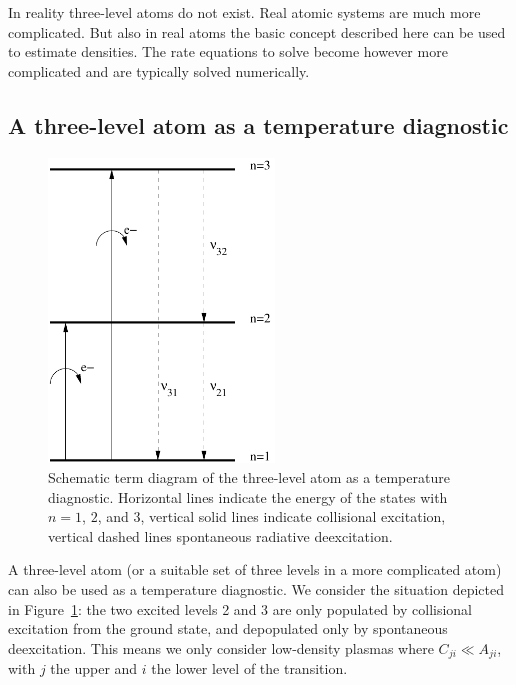 \documentclass[12pt]{article}
\numberwithin{equation}{section}
\begin{document}
In reality three-level atoms do not exist. Real atomic systems are much more complicated. But also in real atoms the basic concept described here can be used to estimate densities. The rate equations to solve become however more complicated and are typically solved numerically. 
 
 \subsection{A three-level atom as a temperature diagnostic}
   
\begin{figure}
  \centering
  \includegraphics[width=6cm]{figs/three-level-atom}
  \caption{Schematic term diagram of the three-level atom as a temperature diagnostic. Horizontal lines indicate the energy of the states with $n=1$, $2$, and $3$, vertical solid lines indicate collisional excitation, vertical dashed lines spontaneous radiative deexcitation.}
  \label{fig:three-level-atom}
\end{figure}

 A three-level atom (or a suitable set of  three levels in a more complicated atom) can also be used as a temperature diagnostic. We consider the situation depicted in Figure~\ref{fig:three-level-atom}: the two excited levels 2 and 3 are only populated by collisional excitation from the ground state, and depopulated only by spontaneous deexcitation. This means we only consider low-density plasmas where $C_{ji} \ll A_{ji}$, with $j$ the upper and $i$ the lower level of the transition.
\end{document}
